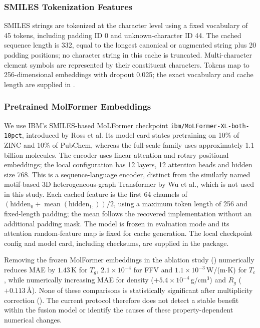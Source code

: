 \documentclass{article}
\begin{document}
\subsubsection{SMILES Tokenization Features}

SMILES strings are tokenized at the character level using a fixed vocabulary of 45 tokens, including padding ID 0 and unknown-character ID 44. The cached sequence length is 332, equal to the longest canonical or augmented string plus 20 padding positions; no character string in this cache is truncated. Multi-character element symbols are represented by their constituent characters. Tokens map to 256-dimensional embeddings with dropout 0.025; the exact vocabulary and cache length are supplied in .

\subsubsection{Pretrained MolFormer Embeddings}

We use IBM's SMILES-based MoLFormer checkpoint \texttt{ibm/MoLFormer-XL-both-10pct}, introduced by Ross et al.\cite{ross_molformer_2022} Its model card states pretraining on 10\% of ZINC and 10\% of PubChem, whereas the full-scale family uses approximately 1.1 billion molecules. The encoder uses linear attention and rotary positional embeddings; the local configuration has 12 layers, 12 attention heads and hidden size 768. This is a sequence-language encoder, distinct from the similarly named motif-based 3D heterogeneous-graph Transformer by Wu et al., which is not used in this study. Each cached feature is the first 64 channels of $(\mathrm{hidden}_0+\operatorname{mean}(\mathrm{hidden}_{1:}))/2$, using a maximum token length of 256 and fixed-length padding; the mean follows the recovered implementation without an additional padding mask. The model is frozen in evaluation mode and its attention random-feature map is fixed for cache generation. The local checkpoint config and model card, including checksums, are supplied in the package.

Removing the frozen MolFormer embeddings in the ablation study () numerically reduces MAE by $1.43$\,K for $T_g$, $2.1 \times 10^{-4}$ for FFV and $1.1 \times 10^{-3}$\,W/(m$\cdot$K) for $T_c$, while numerically increasing MAE for density ($+5.4 \times 10^{-4}$\,g/cm$^3$) and $R_g$ ($+0.113$\,\AA). None of these comparisons is statistically significant after multiplicity correction (). The current protocol therefore does not detect a stable benefit within the fusion model or identify the causes of these property-dependent numerical changes.
\end{document}
